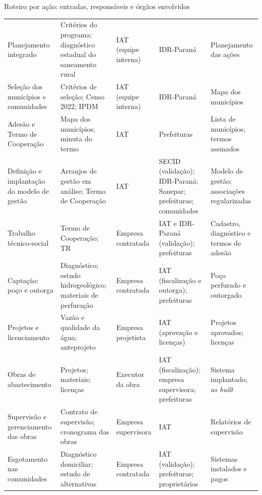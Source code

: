 \begin{landscape}
\begin{quadro}[p]
\caption{Roteiro por ação: entradas, responsáveis e órgãos envolvidos}
\label{qua:roteiro}
\scriptsize
\renewcommand{\arraystretch}{1.25}
\begin{tabularx}{\linewidth}{|P{3.6cm}|L|P{3.2cm}|P{3.9cm}|L|}
\hline
{} &  &  &
 &  \\ \hline
Planejamento integrado & Critérios do programa; diagnóstico estadual do saneamento rural &
  IAT (equipe interna) & IDR-Paraná & Planejamento das ações \\ \hline
Seleção dos municípios e comunidades & Critérios de seleção; Censo 2022; IPDM &
  IAT (equipe interna) & IDR-Paraná & Mapa dos municípios \\ \hline
Adesão e Termo de Cooperação & Mapa dos municípios; minuta do termo &
  IAT & Prefeituras & Lista de municípios; termos assinados \\ \hline
Definição e implantação do modelo de gestão & Arranjos de gestão em análise; Termo de Cooperação &
  IAT & SECID (validação); IDR-Paraná; Sanepar; prefeituras; comunidades &
  Modelo de gestão; associações regularizadas \\ \hline
Trabalho técnico-social & Termo de Cooperação; TR &
  Empresa contratada & IAT e IDR-Paraná (validação); prefeituras &
  Cadastro, diagnóstico e termos de adesão \\ \hline
Captação: poço e outorga & Diagnóstico; estudo hidrogeológico; materiais de perfuração &
  Empresa contratada & IAT (fiscalização e outorga); prefeituras & Poço perfurado e outorgado \\ \hline
Projetos e licenciamento & Vazão e qualidade da água; anteprojeto &
  Empresa projetista & IAT (aprovação e licenças) & Projetos aprovados; licenças \\ \hline
Obras de abastecimento & Projetos; materiais; licenças &
  Executor da obra & IAT (fiscalização); empresa supervisora; prefeituras &
  Sistema implantado; \textit{as built} \\ \hline
Supervisão e gerenciamento das obras & Contrato de supervisão; cronograma das obras &
  Empresa supervisora & IAT & Relatórios de supervisão \\ \hline
Esgotamento nas comunidades & Diagnóstico domiciliar; estudo de alternativas &
  Empresa contratada & IAT (validação); prefeituras; proprietários & Sistemas instalados e pagos \\ \hline

\end{tabularx}
\end{quadro}
\end{landscape}
